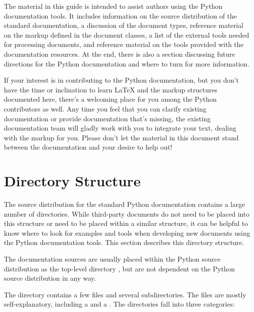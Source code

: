 \documentclass{howto}
\begin{document}
  The material in this guide is intended to assist authors using the
  Python documentation tools.  It includes information on the source
  distribution of the standard documentation, a discussion of the
  document types, reference material on the markup defined in the
  document classes, a list of the external tools needed for processing
  documents, and reference material on the tools provided with the
  documentation resources.  At the end, there is also a section
  discussing future directions for the Python documentation and where
  to turn for more information.

  If your interest is in contributing to the Python documentation, but
  you don't have the time or inclination to learn \LaTeX{} and the
  markup structures documented here, there's a welcoming place for you
  among the Python contributors as well.  Any time you feel that you
  can clarify existing documentation or provide documentation that's
  missing, the existing documentation team will gladly work with you
  to integrate your text, dealing with the markup for you.  Please
  don't let the material in this document stand between the
  documentation and your desire to help out!

\section{Directory Structure \label{directories}}

  The source distribution for the standard Python documentation
  contains a large number of directories.  While third-party documents
  do not need to be placed into this structure or need to be placed
  within a similar structure, it can be helpful to know where to look
  for examples and tools when developing new documents using the
  Python documentation tools.  This section describes this directory
  structure.

  The documentation sources are usually placed within the Python
  source distribution as the top-level directory , but
  are not dependent on the Python source distribution in any way.

  The  directory contains a few files and several
  subdirectories.  The files are mostly self-explanatory, including a
   and a .  The directories fall into
  three categories:
\end{document}
